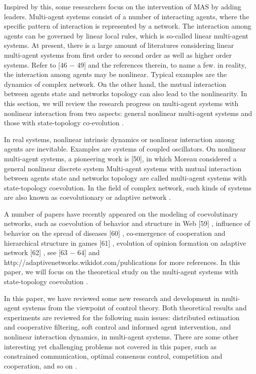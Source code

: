 \documentclass[letterpaper, 10 pt, conference]{ieeeconf}  %
\begin{document}
Inspired by this, some researchers focus on the intervention of MAS by adding leaders.
Multi-agent systems consist of a number of interacting agents, where the specific pattern of interaction is represented by a network. The interaction among agents can be governed by linear local rules, which is so-called linear multi-agent systems. At present, there is a large amount of literatures considering linear multi-agent systems from first order to second order as well as higher order systems. Refer to [46 − 49] and the references therein, to name a few.
in reality, the interaction among agents may be nonlinear. Typical examples are the dynamics of complex network. On the other hand, the mutual interaction between agents state and networks topology can also lead to the nonlinearity. In this section, we will review the research progress on multi-agent systems with nonlinear interaction from two aspects: general nonlinear multi-agent systems and those with state-topology co-evolution \cite{jiang2013estimation}.

In real systems, nonlinear intrinsic dynamics or nonlinear interaction among agents are inevitable. Examples are systems of coupled oscillators. On nonlinear multi-agent systems, a pioneering work is [50], in which Moreau considered a general nonlinear discrete system Multi-agent systems with mutual interaction between agents state and networks topology are called multi-agent systems with state-topology coevolution. In the ﬁeld of complex network, such kinds of systems are also known as coevolutionary or adaptive network \cite{jiang2013estimation}.

A number of papers have recently appeared on the modeling of coevolutinary networks, such as coevolution of behavior and structure in Web [59] , inﬂuence of behavior on the spread of diseases [60] , co-emergence of cooperation and hierarchical structure in games [61] , evolution of opinion formation on adaptive network [62] , see [63 − 64] and http://adaptivenetworks.wikidot.com/publications for more references. In this paper, we will focus on the theoretical study on the multi-agent systems with state-topology coevolution \cite{jiang2013estimation}.

In this paper, we have reviewed some new research and development in multi-agent systems from the viewpoint of control theory. Both theoretical results and experiments are reviewed for the following main issues: distributed estimation and cooperative ﬁltering, soft control and informed agent intervention, and nonlinear interaction dynamics, in multi-agent systems. There are some other interesting yet challenging problems not covered in this paper, such as constrained communication, optimal consensus control, competition and cooperation, and so on \cite{jiang2013estimation}.
\end{document}

